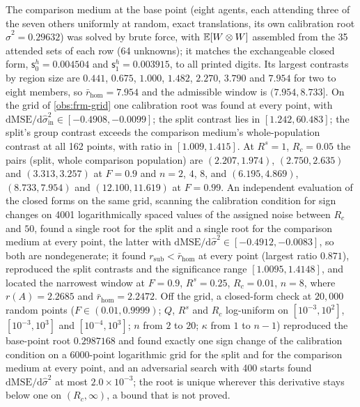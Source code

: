 \begin{numcheck}\label{chk:frm-baseline}
The comparison medium at the base point (eight agents, each attending three of the seven others uniformly at random, exact translations, its own calibration root $\hat\sigma^2=0.29632$) was solved by brute force, with $\mathbb{E}[W\otimes W]$ assembled from the 35 attended sets of each row (64 unknowns); it matches the exchangeable closed form, $\mathsf s^h_0=0.004504$ and $\mathsf s^h_1=0.003915$, to all printed digits. Its largest contrasts by region size are $0.441$, $0.675$, $1.000$, $1.482$, $2.270$, $3.790$ and $7.954$ for two to eight members, so $\bar r_{\mathrm{hom}}=7.954$ and the admissible window is $(7.954,8.733]$. On the grid of \cref{obs:frm-grid} one calibration root was found at every point, with $\mathrm d\mathrm{MSE}/\mathrm d\hat\sigma^2_{\mathrm{in}}\in[-0.4908,-0.0099]$; the split contrast lies in $[1.242,60.483]$; the split's group contrast exceeds the comparison medium's whole-population contrast at all 162 points, with ratio in $[1.009,1.415]$. At $R^s=1$, $R_c=0.05$ the pairs (split, whole comparison population) are $(2.207,1.974)$, $(2.750,2.635)$ and $(3.313,3.257)$ at $F=0.9$ and $n=2$, $4$, $8$, and $(6.195,4.869)$, $(8.733,7.954)$ and $(12.100,11.619)$ at $F=0.99$. An independent evaluation of the closed forms on the same grid, scanning the calibration condition for sign changes on 4001 logarithmically spaced values of the assigned noise between $R_c$ and $50$, found a single root for the split and a single root for the comparison medium at every point, the latter with $\mathrm d\mathrm{MSE}/\mathrm d\hat\sigma^2\in[-0.4912,-0.0083]$, so both are nondegenerate; it found $r_{\mathrm{sub}}<\bar r_{\mathrm{hom}}$ at every point (largest ratio $0.871$), reproduced the split contrasts and the significance range $[1.0095,1.4148]$, and located the narrowest window at $F=0.9$, $R^s=0.25$, $R_c=0.01$, $n=8$, where $r(A)=2.2685$ and $\bar r_{\mathrm{hom}}=2.2472$. Off the grid, a closed-form check at $20{,}000$ random points ($F\in(0.01,0.9999)$; $Q$, $R^s$ and $R_c$ log-uniform on $[10^{-3},10^2]$, $[10^{-3},10^3]$ and $[10^{-4},10^3]$; $n$ from $2$ to $20$; $\kappa$ from $1$ to $n-1$) reproduced the base-point root $0.2987168$ and found exactly one sign change of the calibration condition on a 6000-point logarithmic grid for the split and for the comparison medium at every point, and an adversarial search with 400 starts found $\mathrm d\mathrm{MSE}/\mathrm d\hat\sigma^2$ at most $2.0\times10^{-3}$; the root is unique wherever this derivative stays below one on $(R_c,\infty)$, a bound that is not proved.
\end{numcheck}

